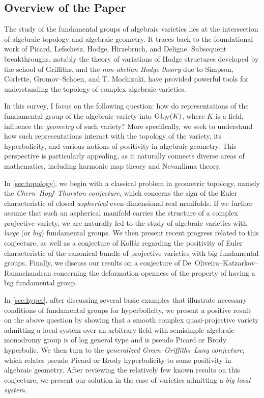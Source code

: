 \documentclass[english]{amsproc}
\theoremstyle{plain}
\theoremstyle{definition}
\theoremstyle{remark}
\theoremstyle{plain}
\numberwithin{equation}{thm} %
\newcommand{\GL}{{\rm GL}}
\begin{document}
	\subsection{Overview of the Paper}
	The study of the fundamental groups of algebraic varieties lies at the intersection of 
	algebraic topology and algebraic geometry. 
	It traces back to the foundational work of Picard, Lefschetz, Hodge, Hirzebruch,  and Deligne. 
	Subsequent breakthroughs, notably the theory of variations of Hodge structures developed by 
	the school of Griffiths, and the \emph{non-abelian Hodge theory} due to Simpson, 
	Corlette, Gromov--Schoen, and T. Mochizuki, have provided powerful tools for understanding the 
	topology of complex algebraic varieties.
	
	In this survey, I focus on the following question: how do representations of the fundamental group  of the algebraic variety
	into \(\GL_N(K)\), where \(K\) is a field, influence the \emph{geometry} of such  variety? 
	More specifically, we seek to understand how such representations interact with the topology 
	of the variety, its  {hyperbolicity}, and various notions of  {positivity} in algebraic geometry. 
	This perspective is particularly appealing, as it naturally connects diverse areas of mathematics, 
	including harmonic map theory and Nevanlinna theory.
	
	In \cref{sec:topology}, we begin with a classical problem in geometric topology, namely the \emph{Chern--Hopf--Thurston conjecture}, which concerns the sign of the Euler characteristic of closed \emph{aspherical} even-dimensional real manifolds.   If we further assume that such an aspherical manifold carries the structure of a complex projective variety, we are naturally led to the study of algebraic varieties with \emph{large} (or \emph{big}) fundamental groups. We then present recent progress related to this conjecture, as well as a conjecture of Kollár regarding the positivity of Euler characteristic of the canonical bundle of projective varieties with big fundamental groups. 	Finally, we discuss our results on a conjecture of 
	De~Oliveira--Katzarkov--Ramachandran concerning the deformation openness of the property of having 
	a big fundamental group.
	
	
	
	In \cref{sec:hyper}, after discussing several basic examples that illustrate necessary conditions of fundamental groups for hyperbolicity, we present a positive result on the above question by showing that a smooth complex quasi-projective variety admitting a local system over an arbitrary field with semisimple algebraic monodromy group is of log general type and is pseudo Picard or Brody hyperbolic.
	We then turn to the \emph{generalized Green--Griffiths--Lang conjecture}, which relates pseudo 
	Picard or Brody hyperbolicity to  some positivity in algebraic geometry. 
	After reviewing the relatively few known results on this conjecture, we present our solution in 
	the case of varieties admitting a \emph{big local system}.
	
\end{document}
